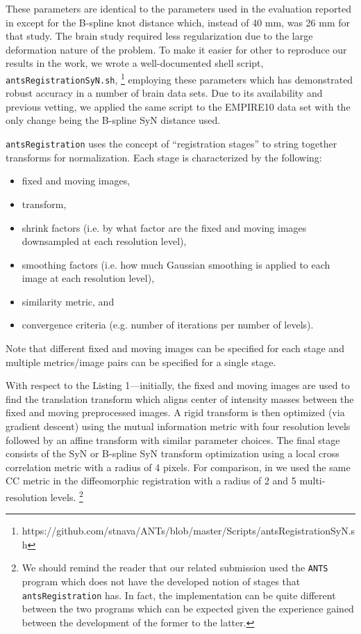 \documentclass{llncs}
\begin{document}
These parameters are identical to the parameters used in the evaluation reported 
in \cite{tustison2013} except for the B-spline knot distance which, instead of
40 mm, was 26 mm for that study.  The brain study required less regularization due
to the large deformation nature of the problem.   To make it easier for other to reproduce our results
in the work, we wrote a well-documented shell script, {\tt antsRegistrationSyN.sh},%
\footnote{
https://github.com/stnava/ANTs/blob/master/Scripts/antsRegistrationSyN.sh
} 
employing these parameters which has demonstrated robust accuracy in a number of 
brain data sets.  Due to its availability and previous vetting, we applied the
same script to the EMPIRE10 data set with the only change being the B-spline SyN
distance used.  

{\tt antsRegistration} uses the concept of ``registration stages'' to string
together transforms for normalization.  Each stage is characterized by the following:
\begin{itemize}
  \item fixed and moving images,
  \item transform,
  \item shrink factors (i.e. by what factor are the fixed and moving images downsampled
  at each resolution level), 
  \item smoothing factors (i.e. how much Gaussian smoothing is applied to each image 
  at each resolution level),
  \item similarity metric, and
  \item convergence criteria (e.g. number of iterations per number of levels).
\end{itemize}
Note that different fixed and moving images can be specified for each stage and
multiple metrics/image pairs can be specified for a single stage.

With respect to the Listing 1---initially, the fixed and moving images
are used to find the translation transform which aligns center of intensity 
masses between the fixed and moving preprocessed images.  A rigid transform
is then optimized (via gradient descent) using the mutual information metric 
with four resolution levels followed by an affine transform with similar 
parameter choices.  The final stage consists of the SyN or B-spline SyN 
transform optimization using a local cross correlation metric with a radius of 
4 pixels.  For comparison, in \cite{song2010} we used the same CC metric in
the diffeomorphic registration with a radius of 2 and 5 multi-resolution levels.%
\footnote{
We should remind the reader that our related submission used the {\tt ANTS} program
which does not have the developed notion of stages that {\tt antsRegistration} has. 
In fact, the implementation can be quite different between the two programs which
can be expected given the experience gained between the development of the former
to the latter.
}  
\end{document}

